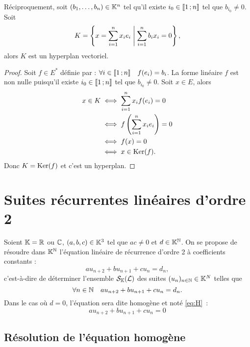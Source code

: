 Réciproquement, soit \((b_1, \ldots, b_n) \in \mathbb{K}^n\) tel qu'il existe \(i_0 \in \mathopen{\llbracket}1\mathclose{}\mathpunct{};n\mathclose{\rrbracket}\) tel que \(b_{i_0} \neq 0\). Soit
\begin{equation}
  K = \left\{x = \sum_{i=1}^n x_i e_i\mathrel{}\middle|\mathrel{}\sum_{i=1}^n b_i x_i =0\right\},
\end{equation}
alors \(K\) est un hyperplan vectoriel.
\begin{proof}
  Soit \(f \in E^*\) définie par : \(\forall i \in \mathopen{\llbracket}1\mathclose{}\mathpunct{};n\mathclose{\rrbracket} \quad f(e_i)=b_i\). La forme linéaire \(f\) est non nulle puisqu'il existe \(i_0 \in \mathopen{\llbracket}1\mathclose{}\mathpunct{};n\mathclose{\rrbracket}\) tel que \(b_{i_0} \neq 0\). Soit \(x \in E\), alors
  \begin{align}
    x \in K &\iff \sum_{i=1}^n x_i f(e_i)=0 \\
            &\iff f\left(\sum_{i=1}^n x_i e_i \right) =0\\
            &\iff f(x)=0\\
            &\iff x \in \operatorname{Ker}(f).
  \end{align}
  Donc \(K=\operatorname{Ker}(f)\) et c'est un hyperplan.
\end{proof}

\section{Suites récurrentes linéaires d'ordre 2}

Soient \(\mathbb{K}=\mathbb{R}\) ou \(\mathbb{C}\), \((a,b,c) \in \mathbb{K}^3\) tel que \(ac \neq 0\) et \(d \in \mathbb{K}^{\mathbb{N}}\). On se propose de résoudre dans \(\mathbb{K}^{\mathbb{N}}\) l'équation linéaire de récurrence d'ordre 2 à coefficients constants :
\begin{equation}
  au_{n+2}+bu_{n+1}+cu_n = d_n \label{eq:S} \tag{\(\Lb\)},
\end{equation}
c'est-à-dire de déterminer l'ensemble \(\mathcal{S}_{\mathbb{K}}(\mathcal{L})\) des suites \((u_n)_{n \in \mathbb{N}} \in \mathbb{K}^N\) telles que
\begin{equation}
  \forall n \in \mathbb{N} \quad au_{n+2}+bu_{n+1}+cu_n = d_n.
\end{equation}
Dans le cas où \(d=0\), l'équation sera dite homogène et noté \eqref{eq:H}~:
\begin{equation}
  au_{n+2}+bu_{n+1}+cu_n = 0 \label{eq:H} \tag{\(\H\)}
\end{equation}

\subsection{Résolution de l'équation homogène}

